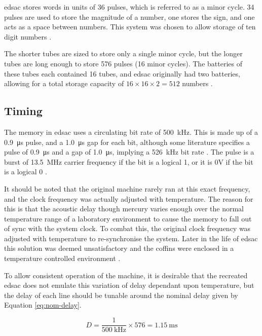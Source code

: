 \Gls{edsac} stores words in units of 36 pulses, which is referred to as a minor cycle. 34 pulses are used to store the magnitude of a number, one stores the sign, and one acts as a space between numbers. This system was chosen to allow storage of ten digit numbers \cite[p.209]{wilkes1948}. 

The shorter tubes are sized to store only a single minor cycle, but the longer tubes are long enough to store 576 pulses (16 minor cycles). The batteries of these tubes each contained 16 tubes, and \gls{edsac} originally had two batteries, allowing for a total storage capacity of $16 \times 16 \times 2 = 512$ numbers \cite[p.210]{wilkes1948}.

\subsection{Timing} \label{sec:review-delay-timing}
The memory in \gls{edsac} uses a circulating bit rate of \SI{500}{\kilo\hertz}. This is made up of a \SI{0.9}{\micro\second} pulse, and a \SI{1.0}{\micro\second} gap for each bit, although some literature specifies a pulse of \SI{0.9}{\micro\second} and a gap of  \SI{1.0}{\micro\second}, implying a \SI{526}{\kilo\hertz} bit rate \cite[p.209]{wilkes1948} \cite[p.2]{cambridge1948}. The pulse is a burst of \SI{13.5}{\mega\hertz} carrier frequency if the bit is a logical 1, or it is 0V if the bit is a logical 0 \cite[p.2]{cambridge1948}.

It should be noted that the original machine rarely ran at this exact frequency, and the clock frequency was actually adjusted with temperature. The reason for this is that the acoustic delay though mercury varies enough over the normal temperature range of a laboratory environment to cause the memory to fall out of sync with the system clock. To combat this, the original clock frequency was adjusted with temperature to re-synchronise the system. Later in the life of \gls{edsac} this solution was deemed unsatisfactory and the coffins were enclosed in a temperature controlled environment \cite[p.81]{wilkes1952}.

To allow consistent operation of the machine, it is desirable that the recreated \gls{edsac} does not emulate this variation of delay dependant upon temperature, but the delay of each line should be tunable around the nominal delay given by Equation \ref{eq:nom-delay}.

\newcommand{\nominalLongTubeDelayMs}{1.15}

\begin{equation}
	D = \frac{1}{\SI{500}{\kilo\hertz}} \times 576 = \SI{\nominalLongTubeDelayMs}{\milli\second}  \label{eq:nom-delay}
\end{equation}



